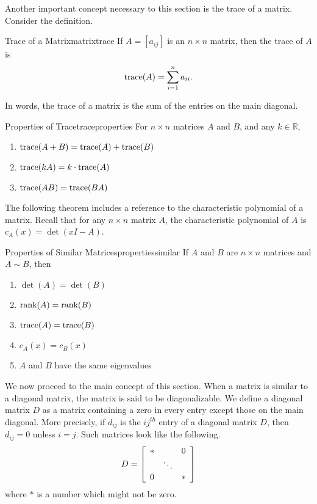 Another important concept necessary to this section is the trace of a matrix. Consider the definition.

\begin{definition}{Trace of a Matrix}{matrixtrace}
%
If $A=[a_{ij}]$ is an $n\times n$ matrix, then the
trace of $A$ is
\[ \mbox{trace}(A) = \sum_{i=1}^n a_{ii}.\]
\end{definition}

In words, the trace of a matrix is the sum of the entries on the main diagonal. 

\begin{lemma}{Properties of Trace}{traceproperties}
For $n\times n$ matrices $A$ and $B$, and any $k\in\mathbb{R}$,
\begin{enumerate}
\item $\mbox{trace}(A+B)=\mbox{trace}(A) + \mbox{trace}(B)$
\item $\mbox{trace}(kA)=k\cdot\mbox{trace}(A)$
\item $\mbox{trace}(AB)=\mbox{trace}(BA)$
\end{enumerate}
\end{lemma}

The following theorem includes a reference to the characteristic polynomial of a matrix. Recall that for any $n \times n$ matrix $A$, the characteristic polynomial of $A$ is $c_A(x)=\det(xI-A)$.

\begin{theorem}{Properties of Similar Matrices}{propertiessimilar}
If $A$ and $B$ are $n\times n$ matrices and $A\sim B$, then
\begin{enumerate}
\item $\det(A) = \det(B)$
\item $\mbox{rank}(A) = \mbox{rank}(B)$
\item $\mbox{trace}(A)= \mbox{trace}(B)$
\item $c_A(x)=c_B(x)$
\item $A$ and $B$ have the same eigenvalues
\end{enumerate}
\end{theorem}

We now proceed to the main concept of this section. When a matrix is similar to a diagonal matrix, the matrix is said to
be
diagonalizable. 
We define a diagonal matrix $D$ as a matrix containing a zero in every entry 
except those on the main diagonal. More precisely, if $d_{ij}$ is the $ij^{th}$ entry of a diagonal matrix $D$, then
$d_{ij}=0$ unless $i=j$. Such
matrices look like the following.
\begin{equation*}
D = \left[
\begin{array}{ccc}
\ast &  & 0 \\
& \ddots &  \\
0 &  & \ast
\end{array}
\right]
\end{equation*}
where $\ast $ is a number which might not be zero.

